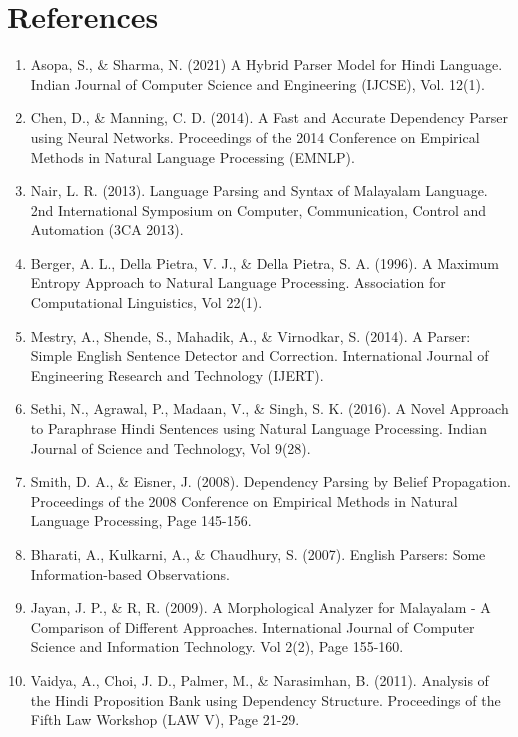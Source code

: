 \documentclass[12pt]{article}
\begin{document}
	\newpage
	\section*{References}
		
	\begin{enumerate}[label=\arabic*.]
		\item Asopa, S., \& Sharma, N. (2021) A Hybrid Parser Model for Hindi Language. Indian Journal
		of Computer Science and Engineering (IJCSE), Vol. 12(1).
		\item Chen, D., \& Manning, C. D. (2014). A Fast and Accurate Dependency Parser using Neural
		Networks. Proceedings of the 2014 Conference on Empirical Methods in Natural
		Language Processing (EMNLP).
		\item Nair, L. R. (2013). Language Parsing and Syntax of Malayalam Language. 2nd International
		Symposium on Computer, Communication, Control and Automation (3CA 2013).
		\item Berger, A. L., Della Pietra, V. J., \& Della Pietra, S. A. (1996). A Maximum Entropy
		Approach to Natural Language Processing. Association for Computational Linguistics, Vol
		22(1).
		\item Mestry, A., Shende, S., Mahadik, A., \& Virnodkar, S. (2014). A Parser: Simple English
		Sentence Detector and Correction. International Journal of Engineering Research and Technology (IJERT).
		\item Sethi, N., Agrawal, P., Madaan, V., \& Singh, S. K. (2016). A Novel Approach to Paraphrase
		Hindi Sentences using Natural Language Processing. Indian Journal of Science and
		Technology, Vol 9(28).
		\item Smith, D. A., \& Eisner, J. (2008). Dependency Parsing by Belief Propagation. Proceedings of
		the 2008 Conference on Empirical Methods in Natural Language Processing, Page 145-156.
		\item Bharati, A., Kulkarni, A., \& Chaudhury, S. (2007). English Parsers: Some Information-based
		Observations.
		\item Jayan, J. P., \& R, R. (2009). A Morphological Analyzer for Malayalam - A Comparison of
		Different Approaches. International Journal of Computer Science and Information
		Technology. Vol 2(2), Page 155-160.
		\item Vaidya, A., Choi, J. D., Palmer, M., \& Narasimhan, B. (2011). Analysis of the Hindi
		Proposition Bank using Dependency Structure. Proceedings of the Fifth Law Workshop (LAW
		V), Page 21-29.

\end{enumerate}
\end{document}
